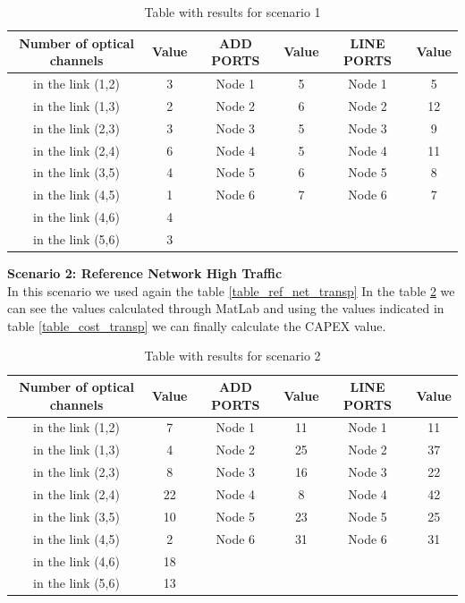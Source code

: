 \begin{table}[h!]
\centering
\begin{tabular}{|| c | c || c | c || c | c ||}
 \hline
 Number of optical channels & Value & ADD PORTS & Value & LINE PORTS & Value \\
 \hline\hline
 in the link (1,2) & 3 & Node 1 & 5 & Node 1 & 5 \\
 in the link (1,3) & 2 & Node 2 & 6 & Node 2 & 12 \\
 in the link (2,3) & 3 & Node 3 & 5 & Node 3 & 9 \\
 in the link (2,4) & 6 & Node 4 & 5 & Node 4 & 11 \\
 in the link (3,5) & 4 & Node 5 & 6 & Node 5 & 8 \\
 in the link (4,5) & 1 & Node 6 & 7 & Node 6 & 7 \\
 in the link (4,6) & 4 & & & & \\
 in the link (5,6) & 3 & & & & \\
 \hline
\end{tabular}
\caption{Table with results for scenario 1}
\label{result_ILP1_TP}
\end{table}


\textbf{Scenario 2: Reference Network High Traffic} \label{Scenario2_transp} \\

In this scenario we used again the table \ref{table_ref_net_transp} In the table \ref{result_ILP2_TP} we can see the values calculated through MatLab and using the values indicated in table \ref{table_cost_transp} we can finally calculate the CAPEX value.\\

\begin{table}[h!]
\centering
\begin{tabular}{|| c | c || c | c || c | c ||}
 \hline
 Number of optical channels & Value & ADD PORTS & Value & LINE PORTS & Value \\
 \hline\hline
 in the link (1,2) & 7 & Node 1 & 11 & Node 1 & 11 \\
 in the link (1,3) & 4 & Node 2 & 25 & Node 2 & 37 \\
 in the link (2,3) & 8 & Node 3 & 16 & Node 3 & 22 \\
 in the link (2,4) & 22 & Node 4 & 8 & Node 4 & 42 \\
 in the link (3,5) & 10 & Node 5 & 23 & Node 5 & 25 \\
 in the link (4,5) & 2 & Node 6 & 31 & Node 6 & 31 \\
 in the link (4,6) & 18 & & & & \\
 in the link (5,6) & 13 & & & & \\
 \hline
\end{tabular}
\caption{Table with results for scenario 2}
\label{result_ILP2_TP}
\end{table}


